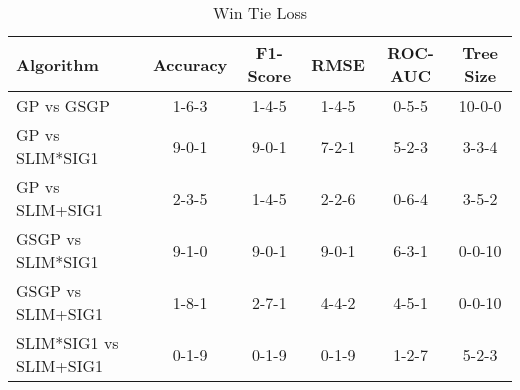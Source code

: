 
    \begin{table}[H]
        \centering
        \renewcommand{\arraystretch}{1.2}
        \caption{Win Tie Loss}
        \label{tab:RQ_Comparison_wtl}
    \begin{tabular}{lccccc}
\toprule
Algorithm & Accuracy & F1-Score & RMSE & ROC-AUC & Tree Size \\
\midrule
GP vs GSGP & 1-6-3 & 1-4-5 & 1-4-5 & 0-5-5 & 10-0-0 \\
GP vs SLIM*SIG1 & 9-0-1 & 9-0-1 & 7-2-1 & 5-2-3 & 3-3-4 \\
GP vs SLIM+SIG1 & 2-3-5 & 1-4-5 & 2-2-6 & 0-6-4 & 3-5-2 \\
GSGP vs SLIM*SIG1 & 9-1-0 & 9-0-1 & 9-0-1 & 6-3-1 & 0-0-10 \\
GSGP vs SLIM+SIG1 & 1-8-1 & 2-7-1 & 4-4-2 & 4-5-1 & 0-0-10 \\
SLIM*SIG1 vs SLIM+SIG1 & 0-1-9 & 0-1-9 & 0-1-9 & 1-2-7 & 5-2-3 \\
\bottomrule
\end{tabular}

        
    \end{table}
    